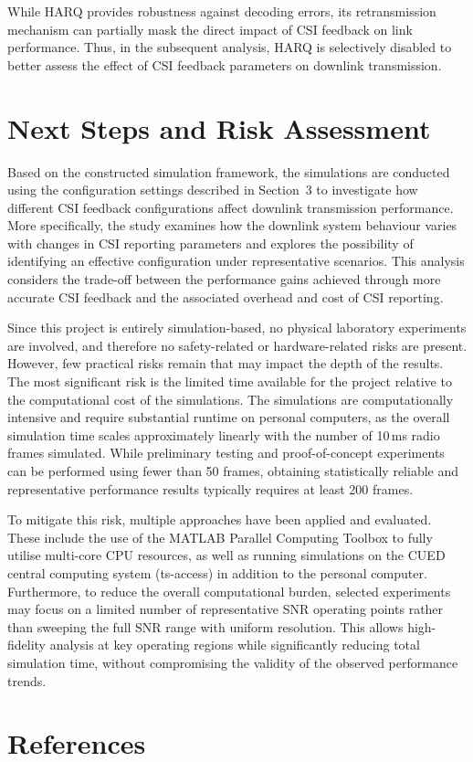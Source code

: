 \documentclass[a4paper,12pt,onecolumn]{article}
\begin{document}
While HARQ provides robustness against decoding errors, its retransmission mechanism can partially mask the direct impact of CSI feedback on link performance. Thus, in the subsequent analysis, HARQ is selectively disabled to better assess the effect of CSI feedback parameters on downlink transmission.

	
	
	\section{Next Steps and Risk Assessment}
Based on the constructed simulation framework, the simulations are conducted using the configuration settings described in Section~3 to investigate how different CSI feedback configurations affect downlink transmission performance. More specifically, the study examines how the downlink system behaviour varies with changes in CSI reporting parameters and explores the possibility of identifying an effective configuration under representative scenarios. This analysis considers the trade-off between the performance gains achieved through more accurate CSI feedback and the associated overhead and cost of CSI reporting.

Since this project is entirely simulation-based, no physical laboratory experiments are involved, and therefore no safety-related or hardware-related risks are present. However, few practical risks remain that may impact the depth of the results. The most significant risk is the limited time available for the project relative to the computational cost of the simulations. The simulations are computationally intensive and require substantial runtime on personal computers, as the overall simulation time scales approximately linearly with the number of 10\,ms radio frames simulated. While preliminary testing and proof-of-concept experiments can be performed using fewer than 50 frames, obtaining statistically reliable and representative performance results typically requires at least 200 frames.

To mitigate this risk, multiple approaches have been applied and evaluated. These include the use of the MATLAB Parallel Computing Toolbox to fully utilise multi-core CPU resources, as well as running simulations on the CUED central computing system (ts-access) in addition to the personal computer. Furthermore, to reduce the overall computational burden, selected experiments may focus on a limited number of representative SNR operating points rather than sweeping the full SNR range with uniform resolution. This allows high-fidelity analysis at key operating regions while significantly reducing total simulation time, without compromising the validity of the observed performance trends.
	\section{References} \let\refname\relax
	\vspace*{-1cm}
	\begingroup
	\footnotesize
	
\endgroup
	
\end{document}
